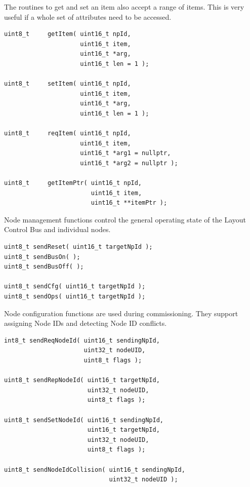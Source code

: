 The routines to get and set an item also accept a range of items. This is very 
useful if a whole set of attributes need to be accessed. 


\begin{lstlisting}[style=api-interface]
uint8_t     getItem( uint16_t npId, 
                     uint16_t item, 
                     uint16_t *arg, 
                     uint16_t len = 1 );

uint8_t     setItem( uint16_t npId, 
                     uint16_t item, 
                     uint16_t *arg,
                     uint16_t len = 1 );

uint8_t     reqItem( uint16_t npId, 
                     uint16_t item, 
                     uint16_t *arg1 = nullptr, 
                     uint16_t *arg2 = nullptr );

uint8_t     getItemPtr( uint16_t npId,
                        uint16_t item,
                        uint16_t **itemPtr );
\end{lstlisting}


Node management functions control the general operating state of the Layout 
Control Bus and individual nodes.

\begin{lstlisting}[style=api-interface]
uint8_t sendReset( uint16_t targetNpId );
uint8_t sendBusOn( );
uint8_t sendBusOff( );

uint8_t sendCfg( uint16_t targetNpId );
uint8_t sendOps( uint16_t targetNpId );
\end{lstlisting}


Node configuration functions are used during commissioning. They support assigning
Node IDs and detecting Node ID conflicts.

\begin{lstlisting}[style=api-interface]
int8_t sendReqNodeId( uint16_t sendingNpId,
                      uint32_t nodeUID,
                      uint8_t flags );

uint8_t sendRepNodeId( uint16_t targetNpId,
                       uint32_t nodeUID,
                       uint8_t flags );

uint8_t sendSetNodeId( uint16_t sendingNpId,
                       uint16_t targetNpId,
                       uint32_t nodeUID,
                       uint8_t flags );

uint8_t sendNodeIdCollision( uint16_t sendingNpId,
                             uint32_t nodeUID );
\end{lstlisting}

